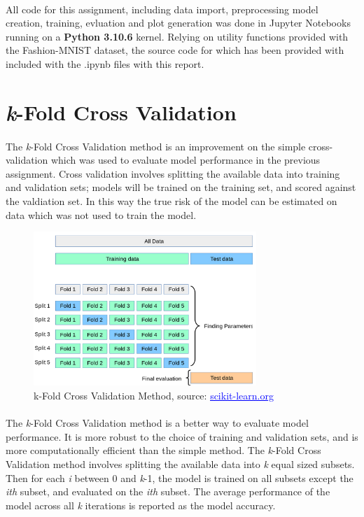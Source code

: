 \documentclass[12pt, letterpaper]{article}
\begin{document}
\paragraph*{}All code for this assignment, including data import, preprocessing
model creation, training, evluation and plot generation was done in Jupyter
Notebooks running on a \textbf{Python 3.10.6} kernel. Relying on utility
functions provided with the Fashion-MNIST dataset, the source code for which
has been provided with included with the .ipynb files with this report.

\section{\textit{k}-Fold Cross Validation}

\paragraph*{}The \textit{k}-Fold Cross Validation method is an improvement
on the simple cross-validation which was used to evaluate model performance
in the previous assignment. Cross validation involves splitting the available
data into training and validation sets; models will be trained on the training
set, and scored against the valdiation set. In this way the true risk of the
model can be estimated on data which was not used to train the model.

\begin{figure}[ht]
    \centering
    \includegraphics[width=0.75\textwidth]{0.png}
    \caption{k-Fold Cross Validation Method, source: \href{https://scikit-learn.org/stable/modules/cross_validation.html}{\textcolor{blue}{\underline{scikit-learn.org}}}}
    \label{fig:1}
\end{figure}

\paragraph*{}The \textit{k}-Fold Cross Validation method is a better way to
evaluate model performance. It is more robust to the choice of training and
validation sets, and is more computationally efficient than the simple
method. The \textit{k}-Fold Cross Validation method involves splitting the
available data into \textit{k} equal sized subsets. Then for each \textit{i}
between 0 and \textit{k}-1, the model is trained on all subsets except the
\textit{ith} subset, and evaluated on the \textit{ith} subset. The average
performance of the model across all \textit{k} iterations is reported as the
model accuracy. 
\end{document}
